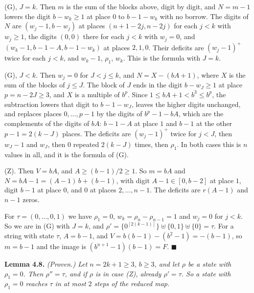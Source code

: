 \documentclass[11pt,letterpaper]{article}
\theoremstyle{paperstyle}
\theoremstyle{paperstyledef}
\theoremstyle{paperstylerem}
\begin{document}
(G), \(J = k\). Then \(m\) is the sum of the blocks above, digit by digit, and \(N = m - 1\) lowers the digit \(b - w_k \geq 1\) at place \(0\) to \(b-1-w_k\) with no borrow. The digits of \(N\) are \((w_j - 1, b - w_j)\) at places \((n+1-2j, n-2j)\) for each \(j < k\) with \(w_j \geq 1\), the digits \((0, 0)\) there for each \(j < k\) with \(w_j = 0\), and \((w_k - 1, b-1-A, b-1-w_k)\) at places \(2, 1, 0\). Their deficits are \((w_j - 1)^+\) twice for each \(j < k\), and \(w_k - 1\), \(\rho_1\), \(w_k\). This is the formula with \(J = k\).

(G), \(J < k\). Then \(w_j = 0\) for \(J < j \leq k\), and \(N = X - (bA + 1)\), where \(X\) is the sum of the blocks of \(j \leq J\). The block of \(J\) ends in the digit \(b - w_J \geq 1\) at place \(p = n - 2J \geq 3\), and \(X\) is a multiple of \(b^p\). Since \(1 \leq bA + 1 < b^3 \leq b^p\), the subtraction lowers that digit to \(b-1-w_J\), leaves the higher digits unchanged, and replaces places \(0, \dots, p-1\) by the digits of \(b^p - 1 - bA\), which are the complements of the digits of \(bA\): \(b-1-A\) at place \(1\) and \(b-1\) at the other \(p - 1 = 2(k-J)\) places. The deficits are \((w_j - 1)^+\) twice for \(j < J\), then \(w_J - 1\) and \(w_J\), then \(0\) repeated \(2(k-J)\) times, then \(\rho_1\). In both cases this is \(n\) values in all, and it is the formula of (G).

(Z). Then \(V = bA\), and \(A \geq (b-1)/2 \geq 1\). So \(m = bA\) and \(N = bA - 1 = (A-1)\, b + (b-1)\), with digit \(A - 1 \in [0, b-2]\) at place \(1\), digit \(b-1\) at place \(0\), and \(0\) at places \(2, \dots, n-1\). The deficits are \(r(A-1)\) and \(n-1\) zeros.

For \(\tau = (0, \dots, 0, 1)\) we have \(\rho_1 = 0\), \(w_k = \rho_n - \rho_{n-1} = 1\) and \(w_j = 0\) for \(j < k\). So we are in (G) with \(J = k\), and \(\rho' = \{0^{[2(k-1)]}\} \uplus \{0, 1\} \uplus \{0\} = \tau\). For a string with state \(\tau\), \(A = b-1\), and \(V = b(b-1) - (b^2 - 1) = -(b-1)\), so \(m = b-1\) and the image is \((b^{n+1} - 1)(b-1) = F\). \(\blacksquare\)

\textbf{Lemma 4.8.} \emph{(Proven.) Let \(n = 2k+1 \geq 3\), \(b \geq 3\), and let \(\rho\) be a state with \(\rho_1 = 0\). Then \(\rho'' = \tau\), and if \(\rho\) is in case (Z), already \(\rho' = \tau\). So a state with \(\rho_1 = 0\) reaches \(\tau\) in at most \(2\) steps of the reduced map.}
\end{document}
